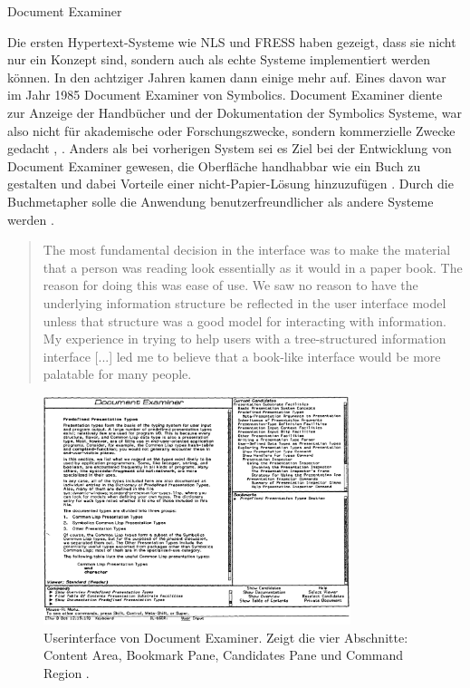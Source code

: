 \begin{section}{Document Examiner}
\label{sec:DocumentExaminer}

Die ersten Hypertext-Systeme wie NLS und FRESS haben gezeigt, dass sie nicht nur ein Konzept sind, sondern auch als echte Systeme implementiert werden können. In den achtziger Jahren kamen dann einige mehr auf. Eines davon war im Jahr 1985 Document Examiner von Symbolics. Document Examiner diente zur Anzeige der Handbücher und der Dokumentation der Symbolics Systeme, war also nicht für akademische oder Forschungszwecke, sondern kommerzielle Zwecke gedacht \cite{Walker1987}, \cite[S. 50]{Nielsen1995}. Anders als bei vorherigen System sei es Ziel bei der Entwicklung von  Document Examiner gewesen, die Oberfläche handhabbar wie ein Buch zu gestalten und dabei Vorteile einer nicht-Papier-Lösung hinzuzufügen \cite{Walker1987}. Durch die Buchmetapher solle die Anwendung benutzerfreundlicher als andere Systeme werden \cite{Walker1987}. 

\begin{quote}
\glqq The most fundamental decision in the interface was to make the material that a person was reading look essentially as it would in a paper book. The reason for doing this was ease of use. We saw no reason to have the underlying information structure be reflected in the user interface model unless that structure was a good model for interacting with information. My experience in trying to help users with a tree-structured information interface [...] led me to believe that a book-like interface would be more palatable for many people. \grqq{ }\cite{Walker1987}
\end{quote}

\begin{figure}[H]
	\centering
	\includegraphics[width=0.8\textwidth]{image/document}
	\caption{Userinterface von Document Examiner. Zeigt die vier Abschnitte: Content Area, Bookmark Pane, Candidates Pane und Command Region \cite{Walker1987}.}
	\label{fig:ducument}
\end{figure}


\end{section}
